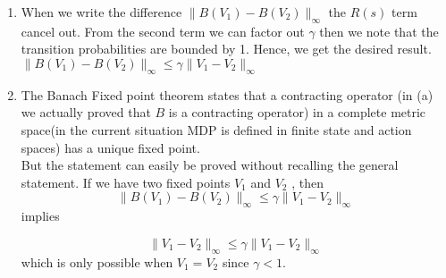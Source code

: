 
\begin{answer}
\begin{enumerate}
    \item 
        When we write the difference $\|B(V_1) - B(V_2)\|_\infty$ the $R(s)$ term cancel out.
        From the second term we can factor out $\gamma$ then we note that the transition probabilities are bounded by 1.
        Hence, we get the desired result.  $\|B(V_1) - B(V_2)\|_\infty \le \gamma \|V_1 - V_2\|_\infty$
\item 
	The Banach Fixed point theorem states that a contracting operator (in (a) we actually proved that $B$ is a contracting operator)
	in a complete metric space(in the current situation MDP is defined in finite state and action spaces) has a unique fixed point.\\
	
	But the statement can easily be proved without recalling the general statement. If we have two fixed points $V_1$ and $V_2$ , then
$$
\|B(V_1) - B(V_2)\|_\infty \le \gamma \|V_1 - V_2\|_\infty
$$
implies

$$
\|V_1 - V_2\|_\infty \le \gamma \|V_1 - V_2\|_\infty
$$
which is only possible when $V_1 = V_2$ since $\gamma < 1$. 






\end{enumerate}
\end{answer}
